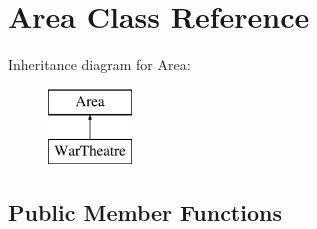 \hypertarget{classArea}{}\section{Area Class Reference}
\label{classArea}
Inheritance diagram for Area\+:\begin{figure}[H]
\begin{center}
\leavevmode
\includegraphics[height=2.000000cm]{classArea}
\end{center}
\end{figure}
\subsection*{Public Member Functions}
